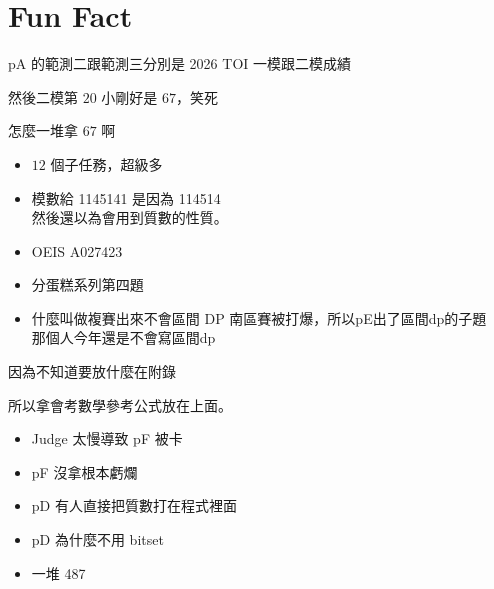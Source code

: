 \section{Fun Fact}

\begin{frame}{}
    pA 的範測二跟範測三分別是 2026 TOI 一模跟二模成績

    然後二模第 $20$ 小剛好是 $67$，笑死

    怎麼一堆拿 $67$ 啊
\end{frame}

\begin{frame}{}
    \begin{itemize}
        \item {$12$ 個子任務，超級多}
    \end{itemize}
\end{frame}

\begin{frame}{}
    \begin{itemize}
        \item {模數給 1145141 是因為 114514\\然後還以為會用到質數的性質。}
        \item {OEIS A027423}
    \end{itemize}
\end{frame}

\begin{frame}{}
    \begin{itemize}
        \item {分蛋糕系列第四題}
        \item {什麼叫做複賽出來不會區間 DP 南區賽被打爆，所以pE出了區間dp的子題 \\ 那個人今年還是不會寫區間dp}
    \end{itemize}
\end{frame}

\begin{frame}{}
    因為不知道要放什麼在附錄

    所以拿會考數學參考公式放在上面。
\end{frame}

\begin{frame}{}
    \begin{itemize}
        \item {Judge 太慢導致 pF 被卡}
        \item {pF 沒拿根本虧爛}
        \item {pD 有人直接把質數打在程式裡面}
        \item {pD 為什麼不用 bitset}
        \item {一堆 487}
    \end{itemize}
\end{frame}
